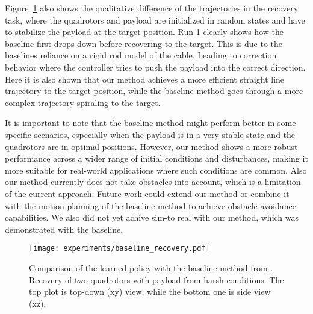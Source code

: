 Figure~\ref{fig:baseline_recovery} also shows the qualitative difference of the trajectories in the recovery task, where the quadrotors and payload are initialized in random states and have to stabilize the payload at the target position. Run 1 clearly shows how the baseline first drops down before recovering to the target. This is due to the baselines reliance on a rigid rod model of the cable. Leading to correction behavior where the controller tries to push the payload into the correct direction. Here it is also shown that our method achieves a more efficient straight line trajectory to the target position, while the baseline method goes through a more complex trajectory spiraling to the target.

It is important to note that the baseline method might perform better in some specific scenarios, especially when the payload is in a very stable state and the quadrotors are in optimal positions. However, our method shows a more robust performance across a wider range of initial conditions and disturbances, making it more suitable for real-world applications where such conditions are common. Also our method currently does not take obstacles into account, which is a limitation of the current approach. Future work could extend our method or combine it with the motion planning of the baseline method to achieve obstacle avoidance capabilities. We also did not yet achive sim-to real with our method, which was demonstrated with the baseline.

\begin{figure}[H]
    \centering
    
    \texttt{[image: experiments/baseline\_recovery.pdf]}
    \caption[Baseline vs Learned Two Quadrotor Recovery]{Comparison of the learned policy with the baseline method from \autocite{wahba_kinodynamic_2024}. Recovery of two quadrotors with payload from harsh conditions. The top plot is top-down  (xy) view, while the bottom one is side view (xz).}
    \label{fig:baseline_recovery}
\end{figure}

